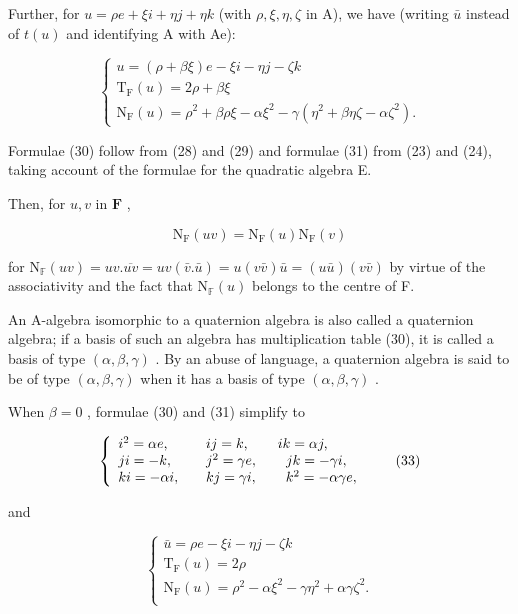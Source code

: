 Further, for \(u = \rho e + \xi i + \eta j + \eta k\) (with \(\rho, \xi, \eta, \zeta\) in A), we have (writing \(\bar{u}\) instead of \(t(u)\) and identifying A with Ae):

\[
\left\{ \begin{array}{c} u = (\rho + \beta \xi) e - \xi i - \eta j - \zeta k \\ \mathrm{T} _ {\mathrm{F}} (u) = 2 \rho + \beta \xi \\ \mathrm{N} _ {\mathrm{F}} (u) = \rho^ {2} + \beta \rho \xi - \alpha \xi^ {2} - \gamma (\eta^ {2} + \beta \eta \zeta - \alpha \zeta^ {2}). \end{array} \right.\tag{31}
\]

Formulae (30) follow from (28) and (29) and formulae (31) from (23) and (24), taking account of the formulae for the quadratic algebra E.

Then, for \(u, v\) in \(\mathbf{F}\) ,

\[
\mathrm{N} _ {\mathrm{F}} (u v) = \mathrm{N} _ {\mathrm{F}} (u) \mathrm{N} _ {\mathrm{F}} (v)\tag{32}
\]

for \(\mathrm{N}_{\mathbb{F}}(uv)=uv.\overline{uv}=uv(\bar{v}.\bar{u})=u(v\bar{v})\bar{u}=(u\bar{u})(v\bar{v})\) by virtue of the associativity and the fact that \(\mathrm{N}_{\mathbb{F}}(u)\) belongs to the centre of F.

An A-algebra isomorphic to a quaternion algebra is also called a quaternion algebra; if a basis of such an algebra has multiplication table (30), it is called a basis of type \((\alpha, \beta, \gamma)\) . By an abuse of language, a quaternion algebra is said to be of type \((\alpha, \beta, \gamma)\) when it has a basis of type \((\alpha, \beta, \gamma)\) .

When \(\beta = 0\) , formulae (30) and (31) simplify to

\[
\left\{ \begin{array}{l l} i ^ {2} = \alpha e, & \quad i j = k, \qquad i k = \alpha j, \\ j i = - k, & \quad j ^ {2} = \gamma e, \qquad j k = - \gamma i, \\ k i = - \alpha i, & \quad k j = \gamma i, \qquad k ^ {2} = - \alpha \gamma e, \end{array} \right.\tag{33}
\]

and

\[
\left\{ \begin{array} {c}\bar {u} = \rho e - \xi i - \eta j - \zeta k \\ \mathrm{T} _ {\mathrm{F}} (u) = 2 \rho \\ \mathrm{N} _ {\mathrm{F}} (u) = \rho^ {2} - \alpha \xi^ {2} - \gamma \eta^ {2} + \alpha \gamma \zeta^ {2}. \\ \end{array} \right.\tag{34}
\]

